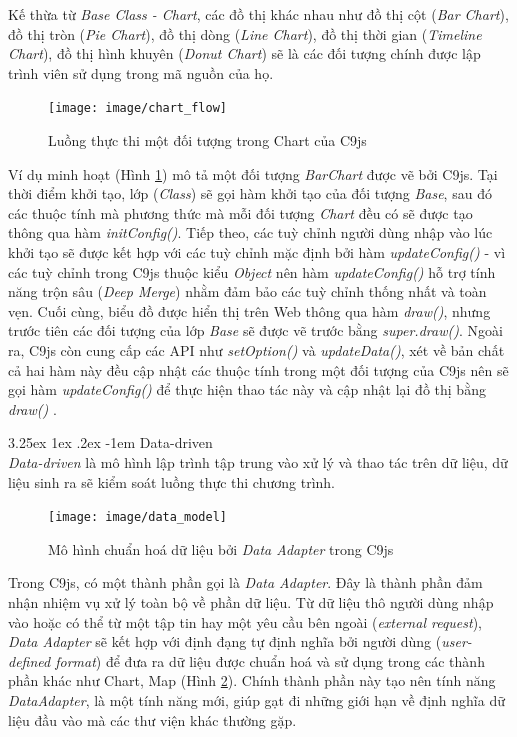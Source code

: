 \documentclass[12pt,a4paper]{article}
\makeatletter
\newcommand{\myparagraph}[1]{\paragraph{#1}\mbox{}\\} %
\renewcommand\paragraph{\@startsection{paragraph}{5}{\z@}%
  {3.25ex \@plus1ex \@minus.2ex}%
  {-1em}%
  {\normalfont\normalsize\bfseries}}
\makeatother
\begin{document}
Kế thừa từ \textit{Base Class - Chart}, các đồ thị khác nhau như đồ thị cột (\textit{Bar Chart}), đồ thị tròn (\textit{Pie Chart}), đồ thị dòng (\textit{Line Chart}), đồ thị thời gian (\textit{Timeline Chart}), đồ thị hình khuyên (\textit{Donut Chart}) sẽ là các đối tượng chính được lập trình viên sử dụng trong mã nguồn của họ.

\begin{figure}[htp]
	\begin{center}
    \texttt{[image: image/chart\_flow]}
    \caption{Luồng thực thi một đối tượng trong Chart của C9js}
    \label{fig:chart_flow}
	\end{center}
\end{figure}

Ví dụ minh hoạt (Hình \ref{fig:chart_flow}) mô tả một đối tượng \textit{BarChart} được vẽ bởi C9js. Tại thời điểm khởi tạo, lớp (\textit{Class}) sẽ gọi hàm khởi tạo của đối tượng \textit{Base}, sau đó các thuộc tính mà phương thức mà mỗi đối tượng \textit{Chart} đều có sẽ được tạo thông qua hàm \textit{initConfig()}. Tiếp theo, các tuỳ chỉnh người dùng nhập vào lúc khởi tạo sẽ được kết hợp với các tuỳ chỉnh mặc định bởi hàm \textit{updateConfig()} - vì các tuỳ chỉnh trong C9js thuộc kiểu \textit{Object} nên hàm \textit{updateConfig()} hỗ trợ tính năng trộn sâu (\textit{Deep Merge})\cite{merge_deep} nhằm đảm bảo các tuỳ chỉnh thống nhất và toàn vẹn. Cuối cùng, biểu đồ được hiển thị trên Web thông qua hàm \textit{draw()}, nhưng trước tiên các đối tượng của lớp \textit{Base} sẽ được vẽ trước bằng \textit{super.draw()}. Ngoài ra, C9js còn cung cấp các API như \textit{setOption()} và \textit{updateData()}, xét về bản chất cả hai hàm này đều cập nhật các thuộc tính trong một đối tượng của C9js nên sẽ gọi hàm \textit{updateConfig()} để thực hiện thao tác này và cập nhật lại đồ thị bằng \textit{draw()} .

\myparagraph{Data-driven}
\textit{Data-driven}\cite{data_driven} là mô hình lập trình tập trung vào xử lý và thao tác trên dữ liệu, dữ liệu sinh ra sẽ kiểm soát luồng thực thi chương trình.

\begin{figure}[htp]
	\begin{center}
    \texttt{[image: image/data\_model]}
    \caption{Mô hình chuẩn hoá dữ liệu bởi \textit{Data Adapter} trong C9js}
    \label{fig:data_model}
	\end{center}
\end{figure}

Trong C9js, có một thành phần gọi là \textit{Data Adapter}. Đây là thành phần đảm nhận nhiệm vụ xử lý toàn bộ về phần dữ liệu. Từ dữ liệu thô người dùng nhập vào hoặc có thể từ một tập tin hay một yêu cầu bên ngoài (\textit{external request}), \textit{Data Adapter} sẽ kết hợp với định đạng tự định nghĩa bởi người dùng (\textit{user-defined format}) để đưa ra dữ liệu được chuẩn hoá và sử dụng trong các thành phần khác như Chart, Map (Hình \ref{fig:data_model}). Chính thành phần này tạo nên tính năng \textit{DataAdapter}, là một tính năng mới, giúp gạt đi những giới hạn về định nghĩa dữ liệu đầu vào mà các thư viện khác thường gặp. 
\end{document}
